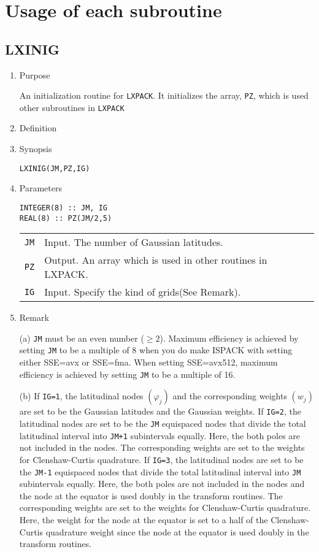\documentclass[a4paper]{scrartcl}
\begin{document}
\section{Usage of each subroutine}

\subsection{LXINIG}

\begin{enumerate}

\item Purpose

An initialization routine for \texttt{LXPACK}.  
It initializes the array, \texttt{PZ},
which is used other subroutines in \texttt{LXPACK}

\item Definition

\item Synopsis 
    
\texttt{LXINIG(JM,PZ,IG)}
  
\item Parameters 

\begin{verbatim}
INTEGER(8) :: JM, IG
REAL(8) :: PZ(JM/2,5)
\end{verbatim}
      
\begin{tabular}{ll}
\texttt{JM} & Input. The number of Gaussian latitudes.\\
\texttt{PZ}  & Output. An array which is used in other routines in LXPACK.\\
\texttt{IG} & Input. Specify the kind of grids(See Remark).
\end{tabular}

\item Remark

(a) \texttt{JM} must be an even number ($\ge 2$).
Maximum efficiency is achieved by setting \texttt{JM} to be 
a multiple of 8 when you do make ISPACK with setting either
SSE=avx or SSE=fma.
When setting SSE=avx512, maximum efficiency is achieved
by setting 
\texttt{JM} to be a multiple of 16.

(b) If \texttt{IG=1}, the latitudinal nodes $(\varphi_j)$
and the corresponding weights $(w_j)$ are set to be the
Gaussian latitudes and the Gaussian weights.
If \texttt{IG=2}, the latitudinal nodes are set to be the
\texttt{JM} equispaced nodes that divide the total latitudinal
interval into \texttt{JM+1} subintervals equally. Here, 
the both poles are not included in the nodes.
The corresponding weights are set to the weights for
Clenshaw-Curtis quadrature.
If \texttt{IG=3}, the latitudinal nodes are set to be the
\texttt{JM-1} equispaced nodes that divide the total latitudinal
interval into \texttt{JM} subintervals equally. Here, 
the both poles are not included in the nodes and
the node at the equator is used doubly in the transform routines.
The corresponding weights are set to the weights for
Clenshaw-Curtis quadrature. Here, the weight for the node
at the equator is set to a half of the Clenshaw-Curtis quadrature
weight since
the node at the equator is used doubly in the transform routines.


\end{enumerate}
\end{document}
